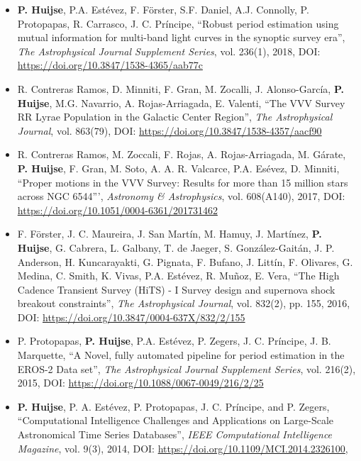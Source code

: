 \documentclass[letterpaper,11pt]{article}
\newcommand{\compactlist}{\setlength{\parskip}{0pt} \setlength{\leftskip}{2em}}
\begin{document}
\begin{enumerate}[I]
	\begin{itemize}  \compactlist{}
        \item \textbf{P. Huijse}, P.A. Est\'evez, F. F\"orster, S.F. Daniel, A.J. Connolly, P. Protopapas, R. Carrasco, J. C. Pr\'incipe, ``Robust period estimation using mutual information for multi-band light curves in the synoptic survey era'', \emph{The Astrophysical Journal Supplement Series}, vol. 236(1), 2018, DOI: \url{https://doi.org/10.3847/1538-4365/aab77c}
        \item R. Contreras Ramos, D. Minniti, F. Gran, M. Zocalli, J. Alonso-Garc\'ia, \textbf{P. Huijse}, M.G. Navarrio, A. Rojas-Arriagada, E. Valenti, ``The VVV Survey RR Lyrae Population in the Galactic Center Region'', \emph{The Astrophysical Journal}, vol. 863(79), DOI: \url{https://doi.org/10.3847/1538-4357/aacf90}
        \item  R. Contreras Ramos, M. Zoccali, F. Rojas, A. Rojas-Arriagada, M. G\'arate, \textbf{P. Huijse}, F. Gran, M. Soto, A. A. R. Valcarce, P.A. Es\'evez, D. Minniti, ``Proper motions in the VVV Survey: Results for more than 15 million stars across NGC 6544''', \emph{Astronomy \& Astrophysics}, vol. 608(A140), 2017, DOI: \url{https://doi.org/10.1051/0004-6361/201731462}
        \item F. F\"orster, J. C. Maureira, J. San Mart\'in, M. Hamuy, J. Mart\'inez, \textbf{P. Huijse}, G. Cabrera, L. Galbany, T. de Jaeger, S. González-Gait\'an, J. P. Anderson, H. Kuncarayakti, G. Pignata, F. Bufano, J. Litt\'in, F. Olivares, G. Medina, C. Smith, K. Vivas, P.A. Est\'evez, R. Muñoz, E. Vera, ``The High Cadence Transient Survey (HiTS) - I Survey design and supernova shock breakout constraints'', \emph{The Astrophysical Journal}, vol. 832(2), pp. 155, 2016, DOI: \url{https://doi.org/10.3847/0004-637X/832/2/155}
        \item P. Protopapas, \textbf{P. Huijse}, P.A. Estévez, P. Zegers, J. C. Príncipe, J. B. Marquette, ``A Novel, fully automated pipeline for period estimation in the {EROS}-2 Data set'', \emph{The Astrophysical Journal Supplement Series}, vol. 216(2), 2015, DOI: \url{https://doi.org/10.1088/0067-0049/216/2/25}
        \item \textbf{P. Huijse}, P. A. Estévez, P. Protopapas, J. C. Príncipe, and P. Zegers, ``Computational Intelligence Challenges and Applications on Large-Scale Astronomical Time Series Databases'', \emph{IEEE Computational Intelligence Magazine}, vol. 9(3), 2014, DOI: \url{https://doi.org/10.1109/MCI.2014.2326100}, \href{https://arxiv.org/pdf/1509.07823.pdf}{\faExternalLink}

\end{itemize}
\end{enumerate}
\end{document}
